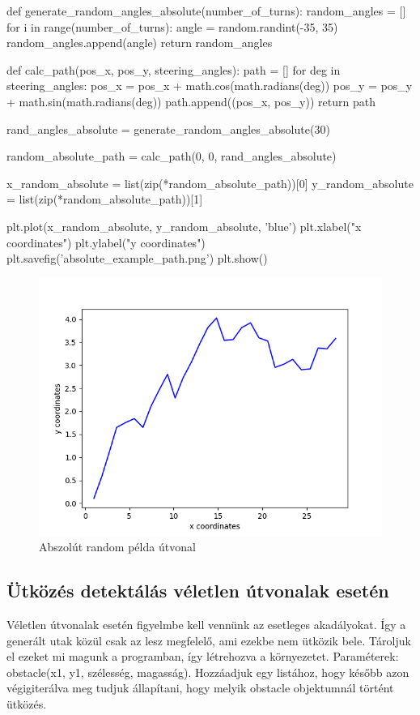 \begin{python}
def generate_random_angles_absolute(number_of_turns):
    random_angles = []
    for i in range(number_of_turns):
        angle = random.randint(-35, 35)
        random_angles.append(angle)
    return random_angles
    
def calc_path(pos_x, pos_y, steering_angles):
    path = []
    for deg in steering_angles:
        pos_x = pos_x + math.cos(math.radians(deg))
        pos_y = pos_y + math.sin(math.radians(deg))
        path.append((pos_x, pos_y))
    return path
    
rand_angles_absolute = generate_random_angles_absolute(30)

random_absolute_path = calc_path(0, 0, rand_angles_absolute)

x_random_absolute = list(zip(*random_absolute_path))[0]
y_random_absolute = list(zip(*random_absolute_path))[1]

plt.plot(x_random_absolute, y_random_absolute, 'blue')
plt.xlabel("x coordinates")
plt.ylabel("y coordinates")
plt.savefig('absolute_example_path.png')
plt.show()
\end{python}

\begin{figure}[h!]
\centering
\includegraphics[scale=0.75]{images/absolute_example_path.png}
\caption{Abszolút random példa útvonal}
\label{fig:absolute_path}
\end{figure}

\subsection{Ütközés detektálás véletlen útvonalak esetén}
Véletlen útvonalak esetén figyelmbe kell vennünk az esetleges akadályokat. Így a generált utak közül csak az lesz megfelelő, ami ezekbe nem ütközik bele. Tároljuk el ezeket mi magunk a programban, így létrehozva a környezetet. Paraméterek: obstacle(x1, y1, szélesség, magasság). Hozzáadjuk egy listához, hogy később azon végigiterálva meg tudjuk állapítani, hogy melyik obstacle objektumnál történt ütközés.

